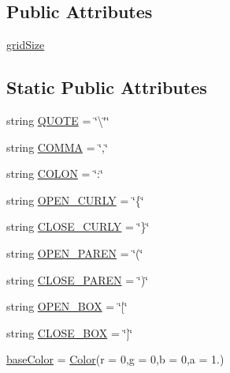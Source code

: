 \subsection*{Public Attributes}
\begin{DoxyCompactItemize}
\item 
\mbox{\hyperlink{class_bridges_1_1_color_grid_1_1_color_grid_acdd1af0874b83b5b77c75ff6747102cc}{grid\+Size}}
\end{DoxyCompactItemize}
\subsection*{Static Public Attributes}
\begin{DoxyCompactItemize}
\item 
string \mbox{\hyperlink{class_bridges_1_1_color_grid_1_1_color_grid_a002fefeb0638ed945322a41c386a5a77}{Q\+U\+O\+TE}} = \char`\"{}\textbackslash{}\char`\"{}\char`\"{}
\item 
string \mbox{\hyperlink{class_bridges_1_1_color_grid_1_1_color_grid_acf1127c478d1982039ba2a40ae4cca77}{C\+O\+M\+MA}} = \char`\"{},\char`\"{}
\item 
string \mbox{\hyperlink{class_bridges_1_1_color_grid_1_1_color_grid_a58499f4301d3108ce3347832d5500879}{C\+O\+L\+ON}} = \char`\"{}\+:\char`\"{}
\item 
string \mbox{\hyperlink{class_bridges_1_1_color_grid_1_1_color_grid_a90f35bbd4c3d1fe9a4968592c11a1656}{O\+P\+E\+N\+\_\+\+C\+U\+R\+LY}} = \char`\"{}\{\char`\"{}
\item 
string \mbox{\hyperlink{class_bridges_1_1_color_grid_1_1_color_grid_ae2e480f319d0f7836737f319965a5f2d}{C\+L\+O\+S\+E\+\_\+\+C\+U\+R\+LY}} = \char`\"{}\}\char`\"{}
\item 
string \mbox{\hyperlink{class_bridges_1_1_color_grid_1_1_color_grid_a9987810ba393470f5a995736e74d22bc}{O\+P\+E\+N\+\_\+\+P\+A\+R\+EN}} = \char`\"{}(\char`\"{}
\item 
string \mbox{\hyperlink{class_bridges_1_1_color_grid_1_1_color_grid_a68f4bd26cd46559b44cd735396e6c132}{C\+L\+O\+S\+E\+\_\+\+P\+A\+R\+EN}} = \char`\"{})\char`\"{}
\item 
string \mbox{\hyperlink{class_bridges_1_1_color_grid_1_1_color_grid_a46229b36208156dfe062b41804cf1416}{O\+P\+E\+N\+\_\+\+B\+OX}} = \char`\"{}\mbox{[}\char`\"{}
\item 
string \mbox{\hyperlink{class_bridges_1_1_color_grid_1_1_color_grid_ad521dc693bd68060060adb3cbee2d5c1}{C\+L\+O\+S\+E\+\_\+\+B\+OX}} = \char`\"{}\mbox{]}\char`\"{}
\item 
\mbox{\hyperlink{class_bridges_1_1_color_grid_1_1_color_grid_a1ea984f1d35cc7c0da84bfb5c8b17ade}{base\+Color}} = \mbox{\hyperlink{class_bridges_1_1_color_1_1_color}{Color}}(r = 0,g = 0,b = 0,a = 1.)
\end{DoxyCompactItemize}


